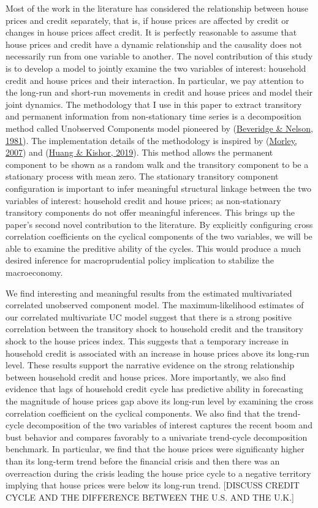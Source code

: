 \documentclass[
  12pt,
]{article}
\begin{document}
Most of the work in the literature has considered the relationship between house prices and credit separately, that is, if house prices are affected by credit or changes in house prices affect credit. It is perfectly reasonable to assume that house prices and credit have a dynamic relationship and the causality does not necessarily run from one variable to another. The novel contribution of this study is to develop a model to jointly examine the two variables of interest: household credit and house prices and their interaction. In particular, we pay attention to the long-run and short-run movements in credit and house prices and model their joint dynamics. The methodology that I use in this paper to extract transitory and permanent information from non-stationary time series is a decomposition method called Unobserved Components model pioneered by (\protect\hyperlink{ref-beveridge_new_1981}{Beveridge \& Nelson, 1981}). The implementation details of the methodology is inspired by (\protect\hyperlink{ref-morley_slow_2007}{Morley, 2007}) and (\protect\hyperlink{ref-huang_rise_2019}{Huang \& Kishor, 2019}). This method allows the permanent component to be shown as a random walk and the transitory component to be a stationary process with mean zero. The stationary transitory component configuration is important to infer meaningful structural linkage between the two variables of interest: household credit and house prices; as non-stationary transitory components do not offer meaningful inferences. This brings up the paper's second novel contribution to the literature. By explicitly configuring cross correlation coefficients on the cyclical components of the two variables, we will be able to examine the preditive ability of the cycles. This would produce a much desired inference for macroprudential policy implication to stabilize the macroeconomy.

We find interesting and meaningful results from the estimated multivariated correlated unobserved component model. The maximum-likelihood estimates of our correlated multivariate UC model suggest that there is a strong positive correlation between the transitory shock to household credit and the transitory shock to the house prices index. This suggests that a temporary increase in household credit is associated with an increase in house prices above its long-run level. These results support the narrative evidence on the strong relationship between household credit and house prices. More importantly, we also find evidence that lags of household credit cycle has predictive ability in forecasting the magnitude of house prices gap above its long-run level by examining the cross correlation coefficient on the cyclical components. We also find that the trend-cycle decomposition of the two variables of interest captures the recent boom and bust behavior and compares favorably to a univariate trend-cycle decomposition benchmark. In particular, we find that the house prices were significanty higher than its long-term trend before the financial crisis and then there was an overreaction during the crisis leading the house price cycle to a negative territory implying that house prices were below its long-run trend. [DISCUSS CREDIT CYCLE AND THE DIFFERENCE BETWEEN THE U.S. AND THE U.K.]
\end{document}
